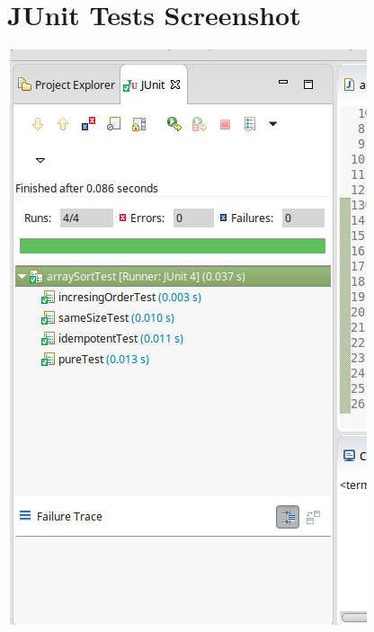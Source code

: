 \documentclass[titlepage]{article}
\begin{document}
\section{JUnit Tests Screenshot}
\includegraphics[width=.75\textwidth,natwidth=400,natheight=640]{PropertyBasedTest.png}
\end{document}
